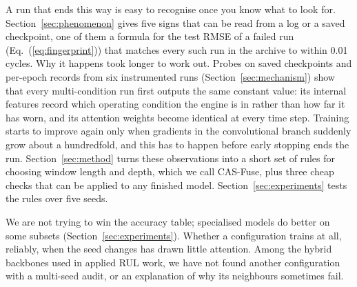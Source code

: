 A run that ends this way is easy to recognise once you know what to look
for. Section~\ref{sec:phenomenon} gives five signs that can be read from a
log or a saved checkpoint, one of them a formula for the test RMSE of a
failed run (Eq.~(\ref{eq:fingerprint})) that matches every such run in the
archive to within 0.01 cycles. Why it happens took longer to work out. Probes
on saved checkpoints and per-epoch records from six instrumented runs
(Section~\ref{sec:mechanism}) show that every multi-condition run first
outputs the same constant value: its internal features record which
operating condition the engine is in rather than how far it has worn, and its
attention weights become identical at every time step. Training starts to
improve again only when gradients in the convolutional branch suddenly grow
about a hundredfold, and this has to happen before early stopping ends the
run. Section~\ref{sec:method} turns these observations into a short set of
rules for choosing window length and depth, which we call CAS-Fuse, plus
three cheap checks that can be applied to any finished model.
Section~\ref{sec:experiments} tests the rules over five seeds.

We are not trying to win the accuracy table; specialised models do better on
some subsets (Section~\ref{sec:experiments}). Whether a configuration trains
at all, reliably, when the seed changes has drawn little attention. Among the
hybrid backbones used in applied RUL work, we have not found another
configuration with a multi-seed audit, or an explanation of why its
neighbours sometimes fail.
